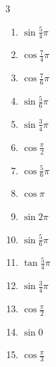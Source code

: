 \begin{multicols}{3}
\begin{enumerate}
  \item $\displaystyle \sin{\frac{5}{4}\pi}$

  \item $\displaystyle \cos{\frac{7}{4}\pi}$

  \item $\displaystyle \cos{\frac{7}{6}\pi}$

  \item $\displaystyle \sin{\frac{5}{6}\pi}$

  \item $\displaystyle \sin{\frac{3}{4}\pi}$

  \item $\displaystyle \cos{\frac{\pi}{2}}$
        \phantom{$\displaystyle =0$}

  \item $\displaystyle \cos{\frac{5}{6}\pi}$

  \item $\displaystyle \cos{\pi}$
        \phantom{$\displaystyle =-1$}

  \item $\displaystyle \sin{2\pi}$
        \phantom{$\displaystyle =0$}

  \item $\displaystyle \sin{\frac{5}{6}\pi}$

  \item $\displaystyle \tan{\frac{5}{4}\pi}$
        \phantom{$\displaystyle =1$}

  \item $\displaystyle \sin{\frac{3}{4}\pi}$

  \item $\displaystyle \cos{\frac{\pi}{2}}$
        \phantom{$\displaystyle =0$}

  \item $\displaystyle \sin{0}$
        \phantom{$\displaystyle =0$}

\columnbreak %

  \item $\displaystyle \cos{\frac{\pi}{3}}$


\end{enumerate}
\end{multicols}
